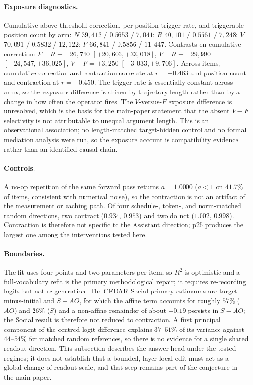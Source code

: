 \documentclass[letterpaper]{article}
\begin{document}
\paragraph{Exposure diagnostics.}
Cumulative above-threshold correction, per-position trigger rate, and triggerable position count by arm: $N$ $39{,}413$ / $0.5653$ / $7{,}041$; $R$ $40{,}101$ / $0.5561$ / $7{,}248$; $V$ $70{,}091$ / $0.5832$ / $12{,}122$; $F$ $66{,}841$ / $0.5856$ / $11{,}447$. Contrasts on cumulative correction: $F-R=+26{,}740$ $[+20{,}606,+33{,}018]$, $V-R=+29{,}990$ $[+24{,}547,+36{,}025]$, $V-F=+3{,}250$ $[-3{,}033,+9{,}706]$. Across items, cumulative correction and contraction correlate at $r=-0.463$ and position count and contraction at $r=-0.450$. The trigger rate is essentially constant across arms, so the exposure difference is driven by trajectory length rather than by a change in how often the operator fires. The $V$-versus-$F$ exposure difference is unresolved, which is the basis for the main-paper statement that the absent $V-F$ selectivity is not attributable to unequal argument length. This is an observational association; no length-matched target-hidden control and no formal mediation analysis were run, so the exposure account is compatibility evidence rather than an identified causal chain.

\paragraph{Controls.}
A no-op repetition of the same forward pass returns $a=1.0000$ ($a<1$ on $41.7\%$ of items, consistent with numerical noise), so the contraction is not an artifact of the measurement or caching path. Of four schedule-, token-, and norm-matched random directions, two contract ($0.934$, $0.953$) and two do not ($1.002$, $0.998$). Contraction is therefore not specific to the Assistant direction; p25 produces the largest one among the interventions tested here.

\paragraph{Boundaries.}
The fit uses four points and two parameters per item, so $R^{2}$ is optimistic and a full-vocabulary refit is the primary methodological repair; it requires re-recording logits but not re-generation. The CEDAR-Social primary estimands are target-minus-initial and $S-AO$, for which the affine term accounts for roughly $57\%$ ($AO$) and $26\%$ ($S$) and a non-affine remainder of about $-0.19$ persists in $S-AO$; the Social result is therefore not reduced to contraction. A first principal component of the centred logit difference explains $37$--$51\%$ of its variance against $44$--$54\%$ for matched random references, so there is no evidence for a single shared readout direction. This subsection describes the answer head under the tested regimes; it does not establish that a bounded, layer-local edit must act as a global change of readout scale, and that step remains part of the conjecture in the main paper.
\end{document}
